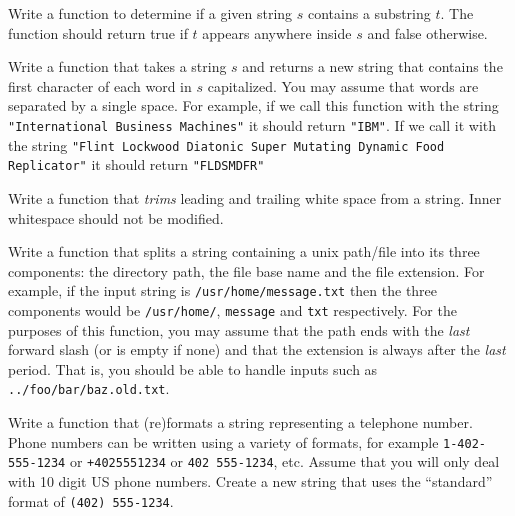 \begin{exer}
Write a function to determine if a given string $s$ contains a substring
$t$.  The function should return true if $t$ appears anywhere inside $s$
and false otherwise.
\end{exer}

\begin{exer}
Write a function that takes a string $s$ and returns a new string that
contains the first character of each word in $s$ capitalized.  You may 
assume that words are separated by a single space.  For example, if we 
call this function with the string \texttt{"International Business Machines"} 
it should return \texttt{"IBM"}.  If we call it with the string
\texttt{"Flint Lockwood Diatonic Super Mutating Dynamic Food Replicator"} 
it should return \texttt{"FLDSMDFR"}
\end{exer}

\begin{exer}
Write a function that \emph{trims} leading and trailing white space from
a string.  Inner whitespace should not be modified.
\end{exer}

\begin{exer}
Write a function that splits a string containing a unix path/file
into its three components: the directory path, the file base 
name and the file extension.  For example, if the input string 
is \texttt{/usr/home/message.txt} then the three 
components would be \texttt{/usr/home/}, 
\texttt{message} and \texttt{txt} respectively.
For the purposes of this function, you may assume that the path
ends with the \emph{last} forward slash (or is empty if none) and that
the extension is always after the \emph{last} period.  That is, you should
be able to handle inputs such as \texttt{../foo/bar/baz.old.txt}.
\end{exer}

\begin{exer}
Write a function that (re)formats a string representing a 
telephone number.  Phone numbers can be written using 
a variety of formats, for example \texttt{1-402-555-1234}
or \texttt{+4025551234} or \texttt{402 555-1234}, 
etc.  Assume that you will only deal with 10 digit US phone numbers.  
Create a new string that uses the ``standard'' format of 
\texttt{(402) 555-1234}.  
\end{exer}

